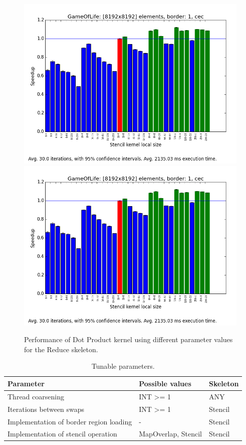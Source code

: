 \begin{figure}[h]
\includegraphics[width=\textwidth]{../../benchmarks/results/e4/GameOfLife-00008192-01-cec.png}
\includegraphics[width=\textwidth]{../../benchmarks/results/e4/GameOfLife-00008192-01-cec.png}
\caption{Performance of Dot Product kernel using different parameter
  values for the Reduce skeleton.}
\end{figure}


\begin{table}
\footnotesize
\centering
\begin{tabular}{| l | l | l |}
\hline
\textbf{Parameter} & \textbf{Possible values} & \textbf{Skeleton}\\
\hline
Thread coarsening & INT >= 1 & ANY\\
Iterations between swaps & INT >= 1 & Stencil\\
Implementation of border region loading & - & Stencil\\
Implementation of stencil operation & {MapOverlap, Stencil} & Stencil\\
\hline
\end{tabular}
\caption{Tunable parameters.}
\end{table}


